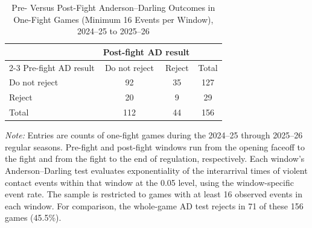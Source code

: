 \begin{table}[htbp]
\centering
\caption{Pre- Versus Post-Fight Anderson--Darling Outcomes in One-Fight Games (Minimum 16 Events per Window), 2024--25 to 2025--26}
\label{tab:one_fight_AD_rejection_min_16_20242025_20252026}
\small
\renewcommand{\arraystretch}{1.15}
\setlength{\tabcolsep}{6pt}

\begin{tabular*}{0.78\textwidth}{@{\extracolsep{\fill}}lccc}
\toprule
 & \multicolumn{2}{c}{Post-fight AD result} & \\
\cmidrule(lr){2-3}
Pre-fight AD result & Do not reject & Reject & Total \\
\midrule
Do not reject & 92 & 35 & 127 \\
Reject & 20 & 9 & 29 \\
\midrule
Total & 112 & 44 & 156 \\
\bottomrule
\end{tabular*}

\vspace{0.4em}
\parbox{0.78\textwidth}{
\footnotesize
\textit{Note:} Entries are counts of one-fight games during the 2024--25 through 2025--26 regular seasons. Pre-fight and post-fight windows run from the opening faceoff to the fight and from the fight to the end of regulation, respectively. Each window's Anderson--Darling test evaluates exponentiality of the interarrival times of violent contact events within that window at the 0.05 level, using the window-specific event rate. The sample is restricted to games with at least 16 observed events in each window. For comparison, the whole-game AD test rejects in 71 of these 156 games (45.5\%).
}
\end{table}

